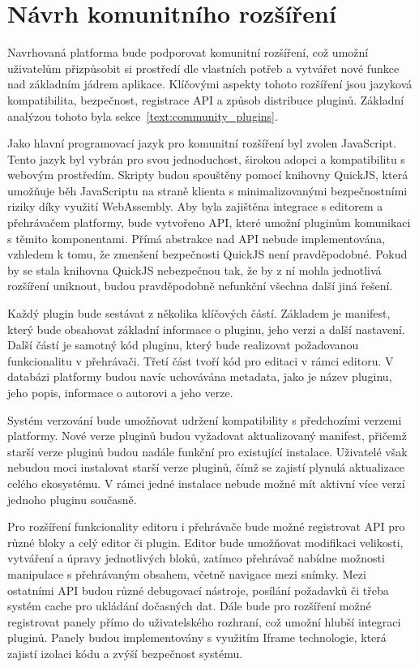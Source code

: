 \section{Návrh komunitního rozšíření}\label{text:navrh/plugins}

Navrhovaná platforma bude podporovat komunitní rozšíření, což umožní uživatelům přizpůsobit si prostředí dle vlastních potřeb a vytvářet nové funkce nad základním jádrem aplikace.
Klíčovými aspekty tohoto rozšíření jsou jazyková kompatibilita, bezpečnost, registrace API a způsob distribuce pluginů.
Základní analýzou tohoto byla sekce~\ref{text:community_plugins}.

Jako hlavní programovací jazyk pro komunitní rozšíření byl zvolen JavaScript.
Tento jazyk byl vybrán pro svou jednoduchost, širokou adopci a kompatibilitu s webovým prostředím.
Skripty budou spouštěny pomocí knihovny QuickJS, která umožňuje běh JavaScriptu na straně klienta s minimalizovanými bezpečnostními riziky díky využití WebAssembly.
Aby byla zajištěna integrace s editorem a přehrávačem platformy, bude vytvořeno API, které umožní pluginům komunikaci s těmito komponentami. 
Přímá abstrakce nad API nebude implementována, vzhledem k tomu, že zmenšení bezpečnosti QuickJS není pravděpodobné.
Pokud by se stala knihovna QuickJS nebezpečnou tak, že by z ní mohla jednotlivá rozšíření uniknout, budou pravděpodobně nefunkční všechna další jiná řešení.

Každý plugin bude sestávat z několika klíčových částí. 
Základem je manifest, který bude obsahovat základní informace o pluginu, jeho verzi a další nastavení. 
Další částí je samotný kód pluginu, který bude realizovat požadovanou funkcionalitu v přehrávači. 
Třetí část tvoří kód pro editaci v rámci editoru. 
V databázi platformy budou navíc uchovávána metadata, jako je název pluginu, jeho popis, informace o autorovi a jeho verze.

Systém verzování bude umožňovat udržení kompatibility s předchozími verzemi platformy. 
Nové verze pluginů budou vyžadovat aktualizovaný manifest, přičemž starší verze pluginů budou nadále funkční pro existující instalace. 
Uživatelé však nebudou moci instalovat starší verze pluginů, čímž se zajistí plynulá aktualizace celého ekosystému.
V rámci jedné instalace nebude možné mít aktivní více verzí jednoho pluginu současně.

Pro rozšíření funkcionality editoru i přehrávače bude možné registrovat API pro různé bloky a celý editor či plugin.
Editor bude umožňovat modifikaci velikosti, vytváření a úpravy jednotlivých bloků, zatímco přehrávač nabídne možnosti manipulace s přehrávaným obsahem, včetně navigace mezi snímky.
Mezi ostatními API budou různé debugovací nástroje, posílání požadavků či třeba systém cache pro ukládání dočasných dat.
Dále bude pro rozšíření možné registrovat panely přímo do uživatelského rozhraní, což umožní hlubší integraci pluginů.
Panely budou implementovány s využitím Iframe technologie, která zajistí izolaci kódu a zvýší bezpečnost systému.

